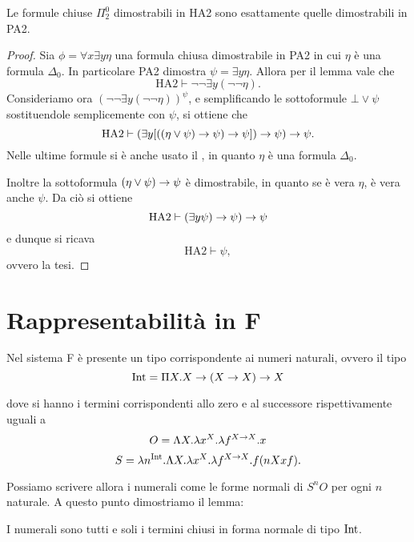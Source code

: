 \documentclass[]{marticle}
\begin{document}
\begin{block}[Proposizione]
    Le formule chiuse $\Pi ^0_2$ dimostrabili in HA2 sono esattamente quelle
    dimostrabili in PA2.
\end{block}
\begin{proof}
    Sia $\phi=\forall x \exists y \eta$ una formula chiusa dimostrabile in PA2
    in cui $\eta$ \`e una formula $\Delta_0$. In particolare PA2 dimostra $\psi
    = \exists y \eta$.  Allora per il lemma  vale che
    \[
        \text{HA2} \vdash \lnot\lnot \exists y (\lnot\lnot \eta).
    \]
    Consideriamo ora $(\lnot\lnot \exists y (\lnot\lnot \eta)) ^\psi$, e
    semplificando le sottoformule $\bot\lor\psi$ sostituendole semplicemente con
    $\psi$, si ottiene che 
    \[
        \text{HA2} \vdash (\exists y [((\eta\lor\psi) \rightarrow \psi) \rightarrow \psi])
        \rightarrow \psi) \rightarrow \psi.
    \]
    Nelle ultime formule si \`e anche usato il , in quanto $\eta$ \`e
    una formula $\Delta_0$.

    Inoltre la sottoformula $(\eta\lor\psi) \rightarrow \psi$ \`e dimostrabile, in
    quanto se \`e vera $\eta$, \`e vera anche $\psi$.  Da ci\`o si ottiene 
    \[
        \text{HA2} \vdash (\exists y  \psi) \rightarrow \psi) \rightarrow \psi
    \]
    e dunque si ricava 
    \[
        \text{HA2} \vdash \psi,
    \]
    ovvero la tesi.
\end{proof}

\section{Rappresentabilit\`a in F}

Nel sistema F \`e presente un tipo corrispondente ai numeri naturali, ovvero il
tipo
\[
    \text{Int} = \Pi X. X \rightarrow (X \rightarrow X) \rightarrow X
\]

dove si hanno i termini corrispondenti allo zero e al successore rispettivamente
uguali a
\[
    O = \Lambda X. \lambda x^{X}. \lambda f^{X\rightarrow X}. x
\]
\[
    S = \lambda n^{\text{Int}}. \Lambda X. \lambda x^X. \lambda f^{X\rightarrow X}. f (nXxf).
\]

Possiamo scrivere allora i numerali come le forme normali di $S^nO$ per ogni $n$
naturale. A questo punto dimostriamo il lemma:

\begin{block}[Lemma]
    I numerali sono tutti e soli i termini chiusi in forma normale di tipo
    $\text{Int}$. 
\end{block}
\end{document}

